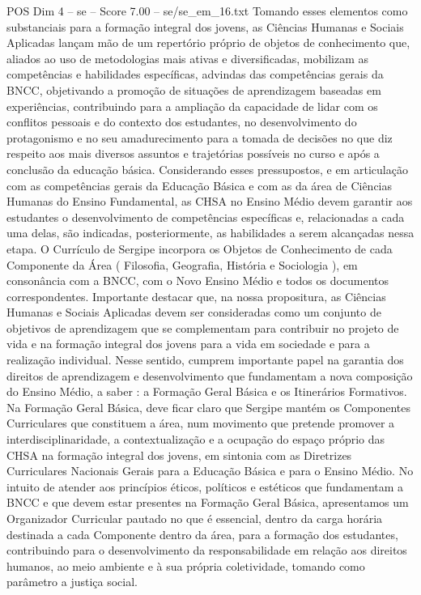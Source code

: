 \begin{textsample}{POS Dim 4 – se – Score 7.00 – se/se\_em\_16.txt}
Tomando esses elementos como substanciais para a formação integral dos jovens, as Ciências Humanas e Sociais Aplicadas lançam mão de um repertório próprio de objetos de conhecimento que, aliados ao uso de metodologias mais ativas e diversificadas, mobilizam as competências e habilidades específicas, advindas das competências gerais da BNCC, objetivando a promoção de situações de aprendizagem baseadas em experiências, contribuindo para a ampliação da capacidade de lidar com os conflitos pessoais e do contexto dos estudantes, no desenvolvimento do protagonismo e no seu amadurecimento para a tomada de decisões no que diz respeito aos mais diversos assuntos e trajetórias possíveis no curso e após a conclusão da educação básica.
Considerando esses pressupostos, e em articulação com as competências gerais da Educação Básica e com as da área de Ciências Humanas do Ensino Fundamental, as CHSA no Ensino Médio devem garantir aos estudantes o desenvolvimento de competências específicas e, relacionadas a cada uma delas, são indicadas, posteriormente, as habilidades a serem alcançadas nessa etapa.
O Currículo de Sergipe incorpora os Objetos de Conhecimento de cada Componente da Área ( Filosofia, Geografia, História e Sociologia ), em consonância com a BNCC, com o Novo Ensino Médio e todos os documentos correspondentes.
Importante destacar que, na nossa propositura, as Ciências Humanas e Sociais Aplicadas devem ser consideradas como um conjunto de objetivos de aprendizagem que se complementam para contribuir no projeto de vida e na formação integral dos jovens para a vida em sociedade e para a realização individual.
Nesse sentido, cumprem importante papel na garantia dos direitos de aprendizagem e desenvolvimento que fundamentam a nova composição do Ensino Médio, a saber : a Formação Geral Básica e os Itinerários Formativos.
Na Formação Geral Básica, deve ficar claro que Sergipe mantém os Componentes Curriculares que constituem a área, num movimento que pretende promover a interdisciplinaridade, a contextualização e a ocupação do espaço próprio das CHSA na formação integral dos jovens, em sintonia com as Diretrizes Curriculares Nacionais Gerais para a Educação Básica e para o Ensino Médio.
No intuito de atender aos princípios éticos, políticos e estéticos que fundamentam a BNCC e que devem estar presentes na Formação Geral Básica, apresentamos um Organizador Curricular pautado no que é essencial, dentro da carga horária destinada a cada Componente dentro da área, para a formação dos estudantes, contribuindo para o desenvolvimento da responsabilidade em relação aos direitos humanos, ao meio ambiente e à sua própria coletividade, tomando como parâmetro a justiça social.

\end{textsample}
